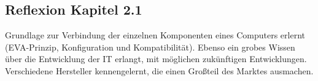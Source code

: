 \subsection*{Reflexion Kapitel 2.1}
    \begin{refindent}
        Grundlage zur Verbindung der einzelnen Komponenten eines Computers erlernt (EVA-Prinzip, Konfiguration und Kompatibilität).
        Ebenso ein grobes Wissen über die Entwicklung der IT erlangt, mit möglichen zukünftigen Entwicklungen.
        Verschiedene Hersteller kennengelernt, die einen Großteil des Marktes ausmachen.
    \end{refindent}